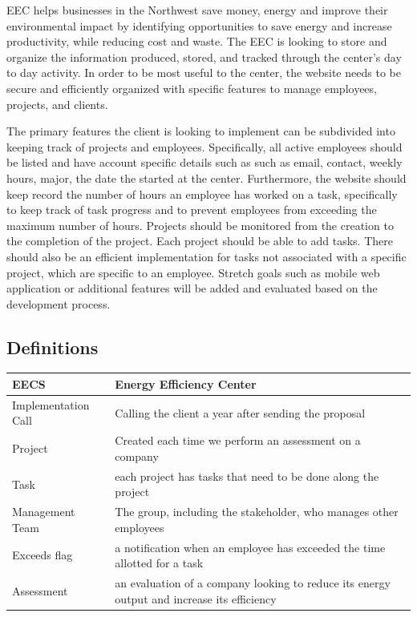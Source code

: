 \documentclass[letterpaper,10pt,titlepage,journal,compsoc,draftclsnofoot,onecolumn]{IEEEtran}
\begin{document}
EEC helps businesses in the Northwest save money, energy and improve their environmental impact by identifying opportunities to save energy and increase productivity, while reducing cost and waste. The EEC is looking to store and organize the information produced, stored, and tracked through the center’s day to day activity. In order to be most useful to the center, the website needs to be secure and efficiently organized with specific features to manage employees, projects, and clients.\par
The primary features the client is looking to implement can be subdivided into keeping track of projects and employees. Specifically, all active employees should be listed and have account specific details such as such as email, contact, weekly hours, major, the date the started at the center. Furthermore, the website should keep record the number of hours an employee has worked on a task, specifically to keep track of task progress and to prevent employees from exceeding the maximum number of hours. Projects should be monitored from the creation to the completion of the project. Each project should be able to add tasks. There should also be an efficient implementation for tasks not associated with a specific project, which are specific to an employee. Stretch goals such as mobile web application or additional features will be added and evaluated based on the development process. 

\subsection{Definitions}

\begin{tabular}{ | l | l | }
\hline
	EECS & Energy Efficiency Center \\ \hline
	Implementation Call & Calling the client a year after sending the proposal \\ \hline
	Project & Created each time we perform an assessment on a company \\ \hline
	Task & each project has tasks that need to be done along the project \\ \hline
	Management Team & The group, including the stakeholder, who manages other employees \\ \hline
	Exceeds flag & a notification when an employee has exceeded the time allotted for a task \\ \hline
	Assessment & an evaluation of a company looking to reduce its energy output and increase its efficiency \\ \hline
\end{tabular}
\end{document}
